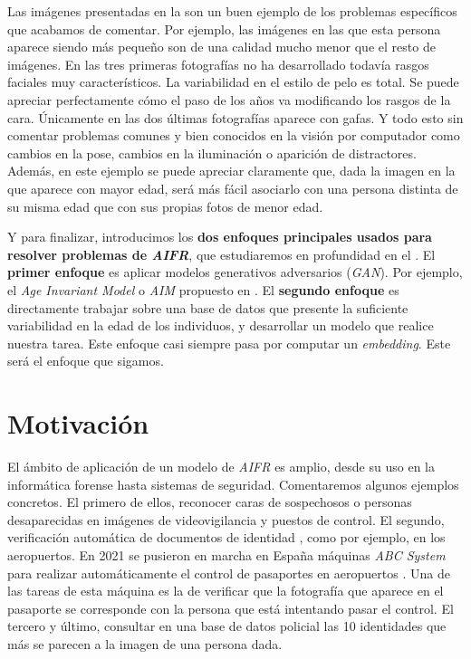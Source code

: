 Las imágenes presentadas en la  son un buen ejemplo de los problemas específicos que acabamos de comentar. Por ejemplo, las imágenes en las que esta persona aparece siendo más pequeño son de una calidad mucho menor que el resto de imágenes. En las tres primeras fotografías no ha desarrollado todavía rasgos faciales muy característicos. La variabilidad en el estilo de pelo es total. Se puede apreciar perfectamente cómo el paso de los años va modificando los rasgos de la cara. Únicamente en las dos últimas fotografías aparece con gafas. Y todo esto sin comentar problemas comunes y bien conocidos en la visión por computador como cambios en la pose, cambios en la iluminación o aparición de distractores. Además, en este ejemplo se puede apreciar claramente que, dada la imagen en la que aparece con mayor edad, será más fácil asociarlo con una persona distinta de su misma edad que con sus propias fotos de menor edad.

Y para finalizar, introducimos los \textbf{dos enfoques principales usados para resolver problemas de \textit{AIFR}}, que estudiaremos en profundidad en  el . El \textbf{primer enfoque} es aplicar modelos generativos adversarios (\textit{GAN}). Por ejemplo, el \textit{Age Invariant Model} o \textit{AIM} propuesto en \cite{informatica:tecnica_sintesis_aifr}. El \textbf{segundo enfoque} es directamente trabajar sobre una base de datos que presente la suficiente variabilidad en la edad de los individuos, y desarrollar un modelo que realice nuestra tarea. Este enfoque casi siempre pasa por computar un \textit{embedding}. Este será el enfoque que sigamos.

\section{Motivación}

El ámbito de aplicación de un modelo de \textit{AIFR} es amplio, desde su uso en la informática forense \cite{informatica:libro_informatica_forense} hasta sistemas de seguridad. Comentaremos algunos ejemplos concretos. El primero de ellos, reconocer caras de sospechosos o personas desaparecidas en imágenes de videovigilancia y puestos de control. El segundo, verificación automática de documentos de identidad  \cite{informatica:tecnica_sintesis_aifr}, como por ejemplo, en los aeropuertos. En 2021 se pusieron en marcha en España máquinas \textit{ABC System} para realizar automáticamente el control de pasaportes en aeropuertos \cite{informatica:articulo_abc_system}. Una de las tareas de esta máquina es la de verificar que la fotografía que aparece en el pasaporte se corresponde con la persona que está intentando pasar el control. El tercero y último, consultar en una base de datos policial las 10 identidades que más se parecen a la imagen de una persona dada.

